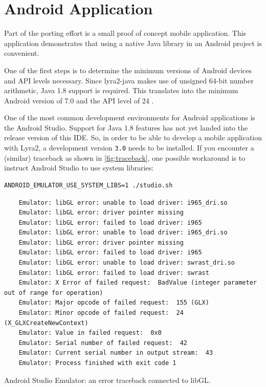 \section{Android Application}
\label{sec:mobile-application}

Part of the porting effort is a small proof of concept mobile application. This application demonstrates that using a native Java library in an Android project is convenient.

One of the first steps is to determine the minimum versions of Android devices and API levels necessary. Since lyra2-java makes use of unsigned 64-bit number arithmetic, Java 1.8 support is required. This translates into the minimum Android version of 7.0 and the API level of 24 \cite{android:2017:java-support}.

One of the most common development environments for Android applications is the Android Studio. Support for Java 1.8 features has not yet landed into the release version of this IDE. So, in order to be able to develop a mobile application with Lyra2, a development version \texttt{3.0} needs to be installed. If you encounter a (similar) traceback as shown in \autoref{fig:traceback}, one possible workaround is to instruct Android Studio to use system libraries:

\begin{verbatim}
ANDROID_EMULATOR_USE_SYSTEM_LIBS=1 ./studio.sh
  \end{verbatim}

\begin{listing}
\begin{verbatim}
    Emulator: libGL error: unable to load driver: i965_dri.so
    Emulator: libGL error: driver pointer missing
    Emulator: libGL error: failed to load driver: i965
    Emulator: libGL error: unable to load driver: i965_dri.so
    Emulator: libGL error: driver pointer missing
    Emulator: libGL error: failed to load driver: i965
    Emulator: libGL error: unable to load driver: swrast_dri.so
    Emulator: libGL error: failed to load driver: swrast
    Emulator: X Error of failed request:  BadValue (integer parameter out of range for operation)
    Emulator: Major opcode of failed request:  155 (GLX)
    Emulator: Minor opcode of failed request:  24 (X_GLXCreateNewContext)
    Emulator: Value in failed request:  0x0
    Emulator: Serial number of failed request:  42
    Emulator: Current serial number in output stream:  43
    Emulator: Process finished with exit code 1
\end{verbatim}
\caption{Android Studio Emulator: an error traceback connected to libGL.}
\label{fig:traceback}
\end{listing}


